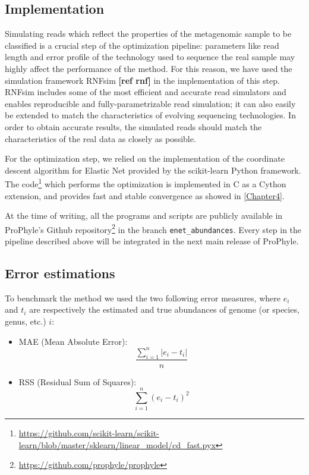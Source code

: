 \subsection{Implementation}

Simulating reads which reflect the properties of the metagenomic sample to be classified is a crucial step of the optimization pipeline: parameters like read length and error profile of the technology used to sequence the real sample may highly affect the performance of the method. For this reason, we have used the simulation framework RNFsim \textbf{[ref rnf]} in the implementation of this step. RNFsim includes some of the most efficient and accurate read simulators and enables reproducible and fully-parametrizable read simulation; it can also easily be extended to match the characteristics of evolving sequencing technologies. In order to obtain accurate results, the simulated reads should match the characteristics of the real data as closely as possible.

For the optimization step, we relied on the implementation of the coordinate descent algorithm for Elastic Net provided by the scikit-learn Python framework. The code\footnote{\url{https://github.com/scikit-learn/scikit-learn/blob/master/sklearn/linear_model/cd_fast.pyx}} which performs the optimization is implemented in C as a Cython extension, and provides fast and stable convergence as showed in \ref{Chapter4}.

At the time of writing, all the programs and scripts are publicly available in ProPhyle's Github repository\footnote{\url{https://github.com/prophyle/prophyle}} in the branch \texttt{enet\_abundances}. Every step in the pipeline described above will be integrated in the next main release of ProPhyle.

\subsection{Error estimations}

To benchmark the method we used the two following error measures, where $e_i$ and $t_i$ are respectively the estimated and true abundances of genome (or species, genus, etc.) $i$:
\begin{itemize}
  \item MAE (Mean Absolute Error):
  \begin{equation*}
    \frac{\sum_{i=1}^n |e_i - t_i|}{n}
  \end{equation*}
  \item RSS (Residual Sum of Squares):
  \begin{equation*}
    \sum_{i=1}^n (e_i - t_i)^2
  \end{equation*}
\end{itemize}

